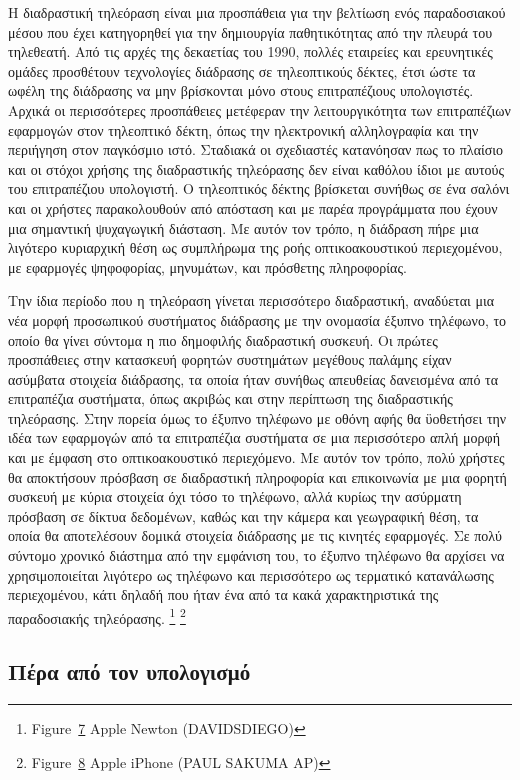 \documentclass[
]{article}
\begin{document}
Η διαδραστική τηλεόραση είναι μια προσπάθεια για την βελτίωση ενός
παραδοσιακού μέσου που έχει κατηγορηθεί για την δημιουργία παθητικότητας
από την πλευρά του τηλεθεατή. Από τις αρχές της δεκαετίας του 1990,
πολλές εταιρείες και ερευνητικές ομάδες προσθέτουν τεχνολογίες διάδρασης
σε τηλεοπτικούς δέκτες, έτσι ώστε τα ωφέλη της διάδρασης να μην
βρίσκονται μόνο στους επιτραπέζιους υπολογιστές. Αρχικά οι περισσότερες
προσπάθειες μετέφεραν την λειτουργικότητα των επιτραπέζιων εφαρμογών
στον τηλεοπτικό δέκτη, όπως την ηλεκτρονική αλληλογραφία και την
περιήγηση στον παγκόσμιο ιστό. Σταδιακά οι σχεδιαστές κατανόησαν πως το
πλαίσιο και οι στόχοι χρήσης της διαδραστικής τηλεόρασης δεν είναι
καθόλου ίδιοι με αυτούς του επιτραπέζιου υπολογιστή. Ο τηλεοπτικός
δέκτης βρίσκεται συνήθως σε ένα σαλόνι και οι χρήστες παρακολουθούν από
απόσταση και με παρέα προγράμματα που έχουν μια σημαντική ψυχαγωγική
διάσταση. Με αυτόν τον τρόπο, η διάδραση πήρε μια λιγότερο κυριαρχική
θέση ως συμπλήρωμα της ροής οπτικοακουστικού περιεχομένου, με εφαρμογές
ψηφοφορίας, μηνυμάτων, και πρόσθετης πληροφορίας.

Την ίδια περίοδο που η τηλεόραση γίνεται περισσότερο διαδραστική,
αναδύεται μια νέα μορφή προσωπικού συστήματος διάδρασης με την ονομασία
έξυπνο τηλέφωνο, το οποίο θα γίνει σύντομα η πιο δημοφιλής διαδραστική
συσκευή. Οι πρώτες προσπάθειες στην κατασκευή φορητών συστημάτων
μεγέθους παλάμης είχαν ασύμβατα στοιχεία διάδρασης, τα οποία ήταν
συνήθως απευθείας δανεισμένα από τα επιτραπέζια συστήματα, όπως ακριβώς
και στην περίπτωση της διαδραστικής τηλεόρασης. Στην πορεία όμως το
έξυπνο τηλέφωνο με οθόνη αφής θα ϋοθετήσει την ιδέα των εφαρμογών από τα
επιτραπέζια συστήματα σε μια περισσότερο απλή μορφή και με έμφαση στο
οπτικοακουστικό περιεχόμενο. Με αυτόν τον τρόπο, πολύ χρήστες θα
αποκτήσουν πρόσβαση σε διαδραστική πληροφορία και επικοινωνία με μια
φορητή συσκευή με κύρια στοιχεία όχι τόσο το τηλέφωνο, αλλά κυρίως την
ασύρματη πρόσβαση σε δίκτυα δεδομένων, καθώς και την κάμερα και
γεωγραφική θέση, τα οποία θα αποτελέσουν δομικά στοιχεία διάδρασης με
τις κινητές εφαρμογές. Σε πολύ σύντομο χρονικό διάστημα από την εμφάνιση
του, το έξυπνο τηλέφωνο θα αρχίσει να χρησιμοποιείται λιγότερο ως
τηλέφωνο και περισσότερο ως τερματικό κατανάλωσης περιεχομένου, κάτι
δηλαδή που ήταν ένα από τα κακά χαρακτηριστικά της παραδοσιακής
τηλεόρασης. \footnote{Figure~\protect\hyperlink{fig:apple-newton}{7}
  Αpple Newton (DAVIDSDIEGO)} \footnote{Figure~\protect\hyperlink{fig:iphone-jobs}{8}
  Apple iPhone (PAUL SAKUMA AP)}

\hypertarget{ux3c0ux3adux3c1ux3b1-ux3b1ux3c0ux3cc-ux3c4ux3bfux3bd-ux3c5ux3c0ux3bfux3bbux3bfux3b3ux3b9ux3c3ux3bcux3cc}{%
\subsection{Πέρα από τον
υπολογισμό}\label{ux3c0ux3adux3c1ux3b1-ux3b1ux3c0ux3cc-ux3c4ux3bfux3bd-ux3c5ux3c0ux3bfux3bbux3bfux3b3ux3b9ux3c3ux3bcux3cc}}
\end{document}
